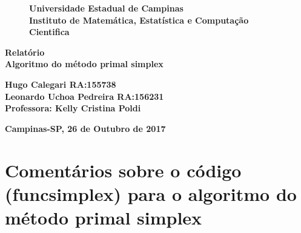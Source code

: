 \documentclass[10pt]{article}
\begin{document}
\begin{titlepage}
\begin{center}
\thispagestyle{empty}
\begin{figure}[!htb]
\begin{center}
\begin{minipage}[b]{0.5\linewidth}
\begin{center}
\end{center}
\end{minipage}
\begin{minipage}[b]{0.7\linewidth}
\begin{center}
\vspace*{1cm}
 {\large \bf Universidade Estadual de Campinas\\[5pt]
Instituto de Matemática, Estatística e Computação Cientifica\\[3pt]
}
\end{center}
\end{minipage}
\end{center}
\end{figure}
\begin{center}
\vspace*{5cm}
{\huge \bf Relatório\\[7pt]
Algoritmo do método primal simplex}
\end{center}
\begin{center}
\vspace*{4cm}
{\Large \bf Hugo Calegari  RA:155738 \\
Leonardo Uchoa Pedreira RA:156231\break
}\\[3pt]
{\large \bf Professora: Kelly Cristina Poldi}\\[5pt]
\end{center}
\centerline{\bf Campinas-SP, 26 de Outubro de 2017}
\end{center}
\end{titlepage}

\section{Comentários sobre o código (funcsimplex) para o algoritmo do método primal simplex}
\newline
\end{document}
